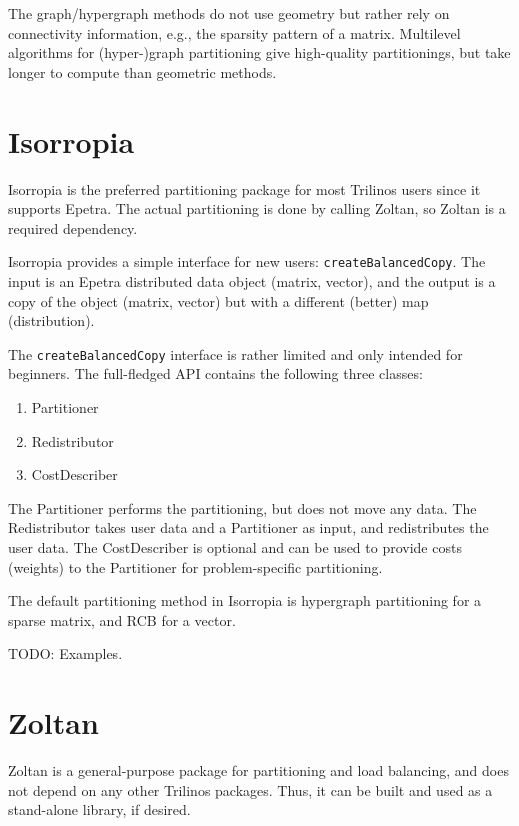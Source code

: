 The graph/hypergraph methods do not use geometry but rather rely on connectivity information, e.g., the sparsity pattern of a matrix. Multilevel algorithms for (hyper-)graph partitioning give high-quality partitionings, but take longer to compute than geometric methods.

\section{Isorropia}
\label{sec:isorropia}
Isorropia is the preferred partitioning package for most Trilinos users
since it supports Epetra. The actual partitioning is done by calling Zoltan,
so Zoltan is a required dependency.

Isorropia provides a simple interface for new users: \texttt{createBalancedCopy}. The input is an Epetra distributed data object (matrix, vector), and the output is a copy of the object (matrix, vector) but with a different (better) map (distribution).

The \texttt{createBalancedCopy} interface is rather limited and only intended for beginners. The full-fledged API contains the following three classes:
\begin{enumerate}
\item Partitioner
\item Redistributor
\item CostDescriber
\end{enumerate}
The Partitioner performs the partitioning, but does not move any data. The Redistributor takes user data and a Partitioner as input, and redistributes the user data. The CostDescriber is optional and can be used to provide costs (weights) to the Partitioner for problem-specific partitioning. 

The default partitioning method in Isorropia is hypergraph partitioning for a sparse matrix, and RCB for a vector.

TODO: Examples.


\section{Zoltan}
\label{sec:zoltan}
Zoltan is a general-purpose package for partitioning and load balancing, and does not depend on any other Trilinos packages. Thus, it can be built and used as a stand-alone library, if desired.


